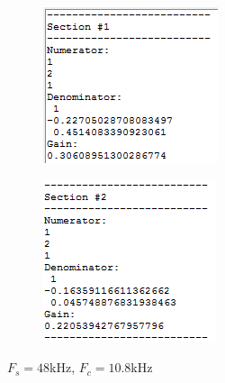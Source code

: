 \documentclass[12pt,a4paper,titlepage]{article}
\begin{document}
\begin{figure}[!htb]
  \centering
  \begin{subfigure}[b]{0.3\textwidth}
    \includegraphics[width=\textwidth]
                    {../presentation/biquad-coeffs-section1-48kfs-10800fc.png}
  \end{subfigure}
  \begin{subfigure}[b]{0.3\textwidth}
    \includegraphics[width=\textwidth]
                    {../presentation/biquad-coeffs-section2-48kfs-10800fc.png}
  \end{subfigure}
  \caption{$F_s = 48$kHz, $F_c = 10.8$kHz}
\end{figure}
\end{document}

